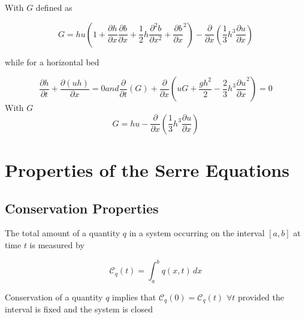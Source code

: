 %
With $G$ defined as
\begin{defn}
	\label{defn:SerreEqnConservedQuantity1}
	\[ G =  h {u} \left(1 + \frac{\partial h}{\partial x}\frac{\partial b}{\partial x} + \frac{1}{2}h\frac{\partial^2 b}{\partial x^2} + \frac{\partial b}{\partial x}^2 \right) - \frac{\partial}{\partial x}\left(\frac{1}{3}h^3  \frac{\partial {u}}{\partial x}\right)\]
\end{defn}

while for a horizontal bed


\begin{subequations}
	\label{eqn:FullSerreConHorizBed}
	\begin{equation}
	\label{eqn:FullSerreConMassHorizBed}
	\frac{\partial h}{\partial t} + \dfrac{\partial (uh)}{\partial x} = 0
	\end{equation}
	
	and
	
	\begin{equation}
	\label{eqn:SerreconsconmomHorizBed}
	\frac{\partial}{\partial t} \left( G \right)  + \frac{\partial}{\partial x} \left( {u} G + \frac{gh^2}{2} - \frac{2}{3}h^3 \frac{\partial {u}}{\partial x}^2 \right) = 0
	\end{equation}
	
\end{subequations}
With $G$ 
\begin{equation}
	\label{defn:SerreEqnConservedQuantity1HorizBed}
G =  h {u}  - \frac{\partial}{\partial x}\left(\frac{1}{3}h^3  \frac{\partial {u}}{\partial x}\right)
\end{equation}


\section{Properties of the Serre Equations}


\subsection{Conservation Properties}

The total amount of a quantity $q$ in a system occurring on the interval $[a,b]$ at time $t$ is measured by
\begin{defn}
	\label{defn:TotalAmmountab}
	\begin{equation*}
	\mathcal{C}_q(t) = \int_{a}^{b} q(x,t)\, dx
	\end{equation*}
\end{defn}
Conservation of a quantity $q$ implies that $\mathcal{C}_{q}(0) = \mathcal{C}_{q}(t)$ $\forall t$ provided the interval is fixed and the system is closed



